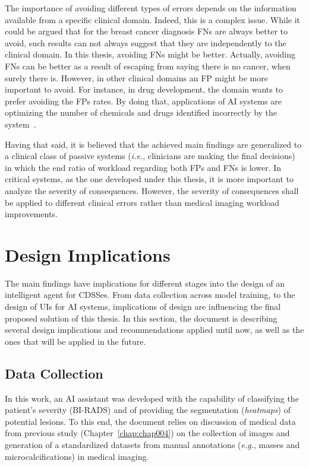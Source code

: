 \hfill

The importance of avoiding different types of errors depends on the information available from a specific clinical domain.
Indeed, this is a complex issue.
While it could be argued that for the breast cancer diagnosis \acp{FN} are always better to avoid, such results can not always suggest that they are independently to the clinical domain.
In this thesis, avoiding \acp{FN} might be better.
Actually, avoiding \acp{FN} can be better as a result of escaping from saying there is no cancer, when surely there is.
However, in other clinical domains an \ac{FP} might be more important to avoid.
For instance, in drug development, the domain wants to prefer avoiding the \acp{FP} rates.
By doing that, applications of \ac{AI} systems are optimizing the number of chemicals and drugs identified incorrectly by the system~\cite{raja2017machine}.

Having that said, it is believed that the achieved main findings are generalized to a clinical class of passive systems ({\it i.e.}, clinicians are making the final decisions) in which the end ratio of workload regarding both \acp{FP} and \acp{FN} is lower.
In critical systems, as the one developed under this thesis, it is more important to analyze the severity of consequences.
However, the severity of consequences shall be applied to different clinical errors rather than medical imaging workload improvements.

\section{Design Implications}
\label{sec:sec007004}

The main findings have implications for different stages into the design of an intelligent agent for \acp{CDSSe}.
From data collection across model training, to the design of \acp{UI} for \ac{AI} systems, implications of design are influencing the final proposed solution of this thesis.
In this section, the document is describing several design implications and recommendations applied until now, as well as the ones that will be applied in the future.

\subsection{Data Collection}
\label{sec:sec007004001}

In this work, an \ac{AI} assistant was developed with the capability of classifying the patient's severity (\ac{BI-RADS}) and of providing the segmentation ({\it heatmaps}) of potential lesions.
To this end, the document relies on discussion of medical data from previous study (Chapter~\ref{chap:chap004}) on the collection of images and generation of a standardized datasets from manual annotations ({\it e.g.}, masses and microcalcifications) in medical imaging.

